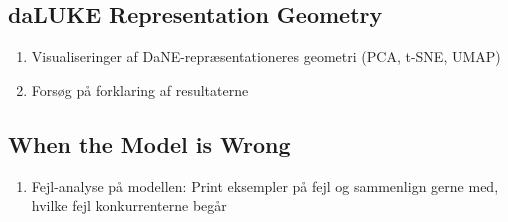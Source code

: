 \documentclass[main.tex]{subfiles}
\begin{document}
\subsection{daLUKE Representation Geometry}

\begin{enumerate}
    \item Visualiseringer af DaNE-repræsentationeres geometri (PCA, t-SNE, UMAP)
    \item Forsøg på forklaring af resultaterne
\end{enumerate}

\subsection{When the Model is Wrong}

\begin{enumerate}
    \item Fejl-analyse på modellen: Print eksempler på fejl og sammenlign gerne med, hvilke fejl konkurrenterne begår
\end{enumerate}
\end{document}
